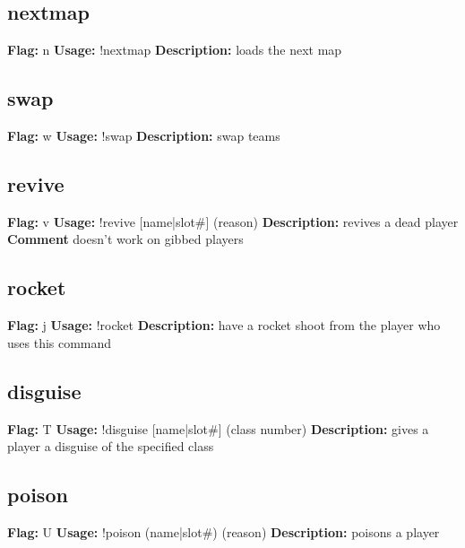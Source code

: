 \subsection{nextmap}
\textbf{Flag:} \hfill n \linebreak\textbf{Usage:} \hfill !nextmap  \linebreak
\textbf{Description:} \hfill loads the next map

\subsection{swap}
\textbf{Flag:} \hfill w \linebreak\textbf{Usage:} \hfill !swap  \linebreak
\textbf{Description:} \hfill swap teams

\subsection{revive}
\textbf{Flag:} \hfill v \linebreak\textbf{Usage:} \hfill !revive [name|slot\#] (reason) \linebreak
\textbf{Description:} \hfill revives a dead player
\linebreak
\textbf{Comment} \hfill doesn't work on gibbed players

\subsection{rocket}
\textbf{Flag:} \hfill j \linebreak\textbf{Usage:} \hfill !rocket  \linebreak
\textbf{Description:} \hfill have a rocket shoot from the player who uses this command

\subsection{disguise}
\textbf{Flag:} \hfill T \linebreak\textbf{Usage:} \hfill !disguise [name|slot\#] (class number) \linebreak
\textbf{Description:} \hfill gives a player a disguise of the specified class

\subsection{poison}
\textbf{Flag:} \hfill U \linebreak\textbf{Usage:} \hfill !poison (name|slot\#) (reason) \linebreak
\textbf{Description:} \hfill poisons a player

